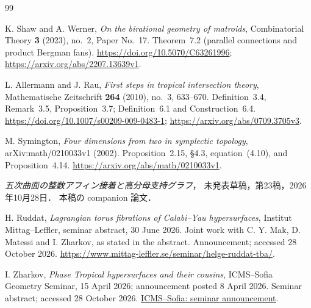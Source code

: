 \begin{thebibliography}{99}

K. Shaw and A. Werner,
\emph{On the birational geometry of matroids},
Combinatorial Theory \textbf{3} (2023), no.~2, Paper No.~17.
Theorem~7.2 (parallel connections and product Bergman fans).
\url{https://doi.org/10.5070/C63261996};
\url{https://arxiv.org/abs/2207.13639v1}.

L. Allermann and J. Rau,
\emph{First steps in tropical intersection theory},
Mathematische Zeitschrift \textbf{264} (2010), no.~3, 633--670.
Definition~3.4, Remark~3.5, Proposition~3.7;
Definition~6.1 and Construction~6.4.
\url{https://doi.org/10.1007/s00209-009-0483-1};
\url{https://arxiv.org/abs/0709.3705v3}.

M. Symington,
\emph{Four dimensions from two in symplectic topology},
arXiv:math/0210033v1 (2002).
Proposition~2.15, \S4.3, equation~(4.10), and Proposition~4.14.
\url{https://arxiv.org/abs/math/0210033v1}.

\emph{五次曲面の整数アフィン接着と高分母支持グラフ}，
未発表草稿，第23稿，2026年10月28日．
本稿の companion 論文．


H. Ruddat,
\emph{Lagrangian torus fibrations of Calabi--Yau hypersurfaces},
Institut Mittag--Leffler, seminar abstract, 30 June 2026.
Joint work with C. Y. Mak, D. Matessi and I. Zharkov, as stated in the abstract.
Announcement; accessed 28 October 2026.
\url{https://www.mittag-leffler.se/seminar/helge-ruddat-tba/}.

I. Zharkov,
\emph{Phase Tropical hypersurfaces and their cousins},
ICMS--Sofia Geometry Seminar, 15 April 2026; announcement posted 8 April 2026.
Seminar abstract; accessed 28 October 2026.
\href{https://icms.bg/phase-tropical-hypersurfaces-and-their-cousins-geometry-seminar-talk-by-ilia-zharkov/}{ICMS--Sofia: seminar announcement}.

\end{thebibliography}
